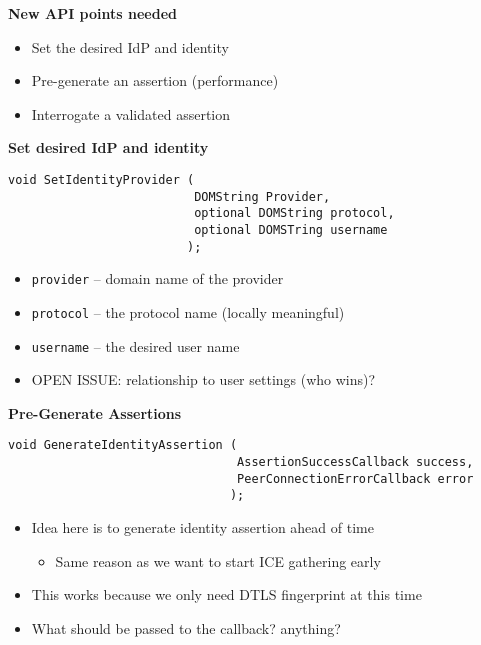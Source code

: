 \documentclass[helvetica]{seminar}
\newcommand{\heading}[1]{%
  \begin{center} 
    \large\bf 
    #1 
  \end{center} 
  \vspace{.4 in}}
\begin{document}
\begin{slide}
\heading{New API points needed}

\begin{itemize}
\item Set the desired IdP and identity
\item Pre-generate an assertion (performance)
\item Interrogate a validated assertion
\end{itemize}

\end{slide}



\begin{slide}
\heading{Set desired IdP and identity}

\begin{verbatim}
void SetIdentityProvider (
                          DOMString Provider,
                          optional DOMString protocol,
                          optional DOMSTring username
                         );
\end{verbatim}

\vspace{1ex}

\noindent\begin{itemize}
\item[] \verb^provider^ -- domain name of the provider
\item[] \verb^protocol^ -- the protocol name (locally meaningful)
\item[] \verb^username^ -- the desired user name
\end{itemize}

\vspace{1ex}
\begin{itemize}
\item OPEN ISSUE: relationship to user settings (who wins)?
\end{itemize}
\end{slide}


\begin{slide}
\heading{Pre-Generate Assertions}

\begin{verbatim}
void GenerateIdentityAssertion (
                                AssertionSuccessCallback success,
                                PeerConnectionErrorCallback error
                               );
\end{verbatim}

\vspace{1ex}

\begin{itemize}
\item Idea here is to generate identity assertion ahead of time
  \begin{itemize}
  \item Same reason as we want to start ICE gathering early
  \end{itemize}

\item This works because we only need DTLS fingerprint at this time
\item What should be passed to the callback? anything?
\end{itemize}
\end{slide}
\end{document}
